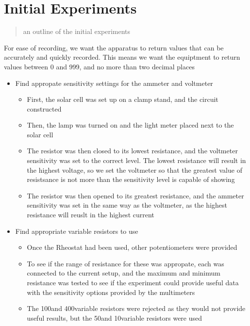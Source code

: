 \documentclass{article}
\begin{document}
\section{Initial Experiments}
\begin{quote}
an outline of the initial experiments
\end{quote}
For ease of recording, we want the apparatus to return values that can be accurately and quickly recorded. This means we want the equiptment to return values between 0 and 999, and no more than two decimal places
\begin{itemize}
  \item Find appropate sensitivity settings for the ammeter and voltmeter
  \begin{itemize}
    \item First, the solar cell was set up on a clamp stand, and the circuit constructed
    \item Then, the lamp was turned on and the light meter placed next to the solar cell
    \item The resistor was then closed to its lowest resistance, and the voltmeter sensitivity was set to the correct level. The lowest resistance will result in the highest voltage, so we set the voltmeter so that the greatest value of resistsance is not more than the sensitivity level is capable of showing
    \item The resistor was then opened to its greatest resistance, and the ammeter sensitivity was set in the same way as the voltmeter, as the highest resistance will reuslt in the highest current
  \end{itemize}
  \item Find appropriate variable resistors to use
  \begin{itemize}
    \item Once the Rheostat had been used, other potentiometers were provided
    \item To see if the range of resistance for these was appropate, each was connected to the current setup, and the maximum and minimum resistance was tested to see if the experiment could provide useful data with the sensitivity options provided by the multimeters
    \item The 100\Omega and 400\Omega variable resistors were rejected as they would not provide useful results, but the 50\Omega and 10\Omega variable resistors were used
  \end{itemize}

\end{itemize}
\end{document}
